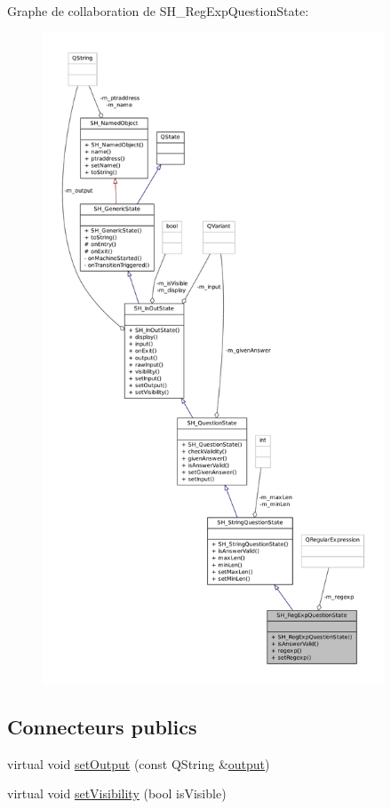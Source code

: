 Graphe de collaboration de S\-H\-\_\-\-Reg\-Exp\-Question\-State\-:
\nopagebreak
\begin{figure}[H]
\begin{center}
\leavevmode
\includegraphics[height=550pt]{classSH__RegExpQuestionState__coll__graph}
\end{center}
\end{figure}
\subsection*{Connecteurs publics}
\begin{DoxyCompactItemize}
\item 
virtual void \hyperlink{classSH__InOutState_a7dc244d72e09fdbc30eb3a704b05a4d8}{set\-Output} (const Q\-String \&\hyperlink{classSH__InOutState_a1a2fd4f34484125058e20730aaee7e46}{output})
\item 
virtual void \hyperlink{classSH__InOutState_a7706a2ea1367ab3416db27fa0f4794f7}{set\-Visibility} (bool is\-Visible)
\end{DoxyCompactItemize}
